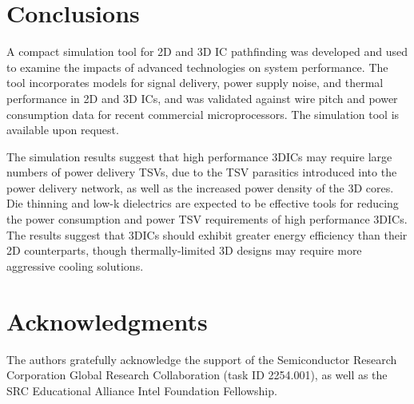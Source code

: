 \documentclass[journal,twoside]{IEEEtran}
\newcommand{\changed}[1]{\textcolor{red}{#1}}
\newcommand{\rerechanged}[1]{\textcolor{red}{#1}}
\renewcommand{\changed}[1]{#1} %
\renewcommand{\rerechanged}[1]{#1} %
\begin{document}

\section{Conclusions}
A compact simulation tool for 2D and 3D IC pathfinding was developed and used to examine the impacts of 
advanced technologies on system performance.
The tool incorporates models for signal delivery, power supply noise, and thermal performance in 2D and 3D ICs,
and was validated against wire pitch and power consumption data for recent commercial microprocessors.
\rerechanged{The simulation tool is available upon request.}
\changed{
The simulation results suggest that high performance 3DICs may require large numbers of power delivery TSVs,
due to the TSV parasitics introduced into the power delivery network, as well as the
increased power density of the 3D cores. Die thinning and low-k dielectrics are expected to
be effective tools for reducing the power consumption and power TSV requirements of high performance 3DICs.
The results suggest that 3DICs should exhibit greater energy efficiency
than their 2D counterparts, though \rerechanged{thermally-limited} 3D designs may require more aggressive cooling solutions.}



\section*{Acknowledgments}
The authors gratefully acknowledge the support of the Semiconductor
Research Corporation Global Research Collaboration (task ID 2254.001),
as well as the SRC Educational Alliance Intel Foundation Fellowship.




\end{document}
